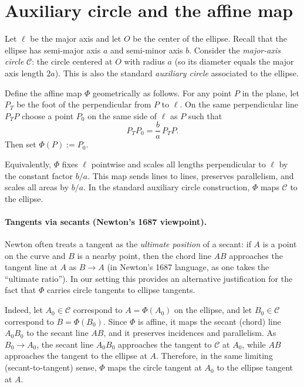 \section{Auxiliary circle and the affine map}

Let $\ell$ be the major axis and let $O$ be the center of the ellipse. Recall that the ellipse has semi-major axis $a$ and semi-minor axis $b$. Consider the \emph{major-axis circle} $\mathcal C$: the circle centered at $O$ with radius $a$ (so its diameter equals the major axis length $2a$). This is also the standard \emph{auxiliary circle} associated to the ellipse.

Define the affine map $\Phi$ geometrically as follows. For any point $P$ in the plane, let $P_T$ be the foot of the perpendicular from $P$ to $\ell$. On the same perpendicular line $P_TP$ choose a point $P_0$ on the same side of $\ell$ as $P$ such that
\begin{equation}
  P_TP_0=\frac{b}{a}\,P_TP.
\end{equation}
Then set $\Phi(P):=P_0$.

Equivalently, $\Phi$ fixes $\ell$ pointwise and scales all lengths perpendicular to $\ell$ by the constant factor $b/a$. This map sends lines to lines, preserves parallelism, and scales all areas by $b/a$. In the standard auxiliary circle construction, $\Phi$ maps $\mathcal C$ to the ellipse.

\paragraph{Tangents via secants (Newton's 1687 viewpoint).}
Newton often treats a tangent as the \emph{ultimate position} of a secant: if $A$ is a point on the curve and $B$ is a nearby point, then the chord line $AB$ approaches the tangent line at $A$ as $B\to A$ (in Newton's 1687 language, as one takes the ``ultimate ratio''). In our setting this provides an alternative justification for the fact that $\Phi$ carries circle tangents to ellipse tangents.

Indeed, let $A_0\in\mathcal C$ correspond to $A=\Phi(A_0)$ on the ellipse, and let $B_0\in\mathcal C$ correspond to $B=\Phi(B_0)$. Since $\Phi$ is affine, it maps the secant (chord) line $A_0B_0$ to the secant line $AB$, and it preserves incidences and parallelism. As $B_0\to A_0$, the secant line $A_0B_0$ approaches the tangent to $\mathcal C$ at $A_0$, while $AB$ approaches the tangent to the ellipse at $A$. Therefore, in the same limiting (secant-to-tangent) sense, $\Phi$ maps the circle tangent at $A_0$ to the ellipse tangent at $A$.


